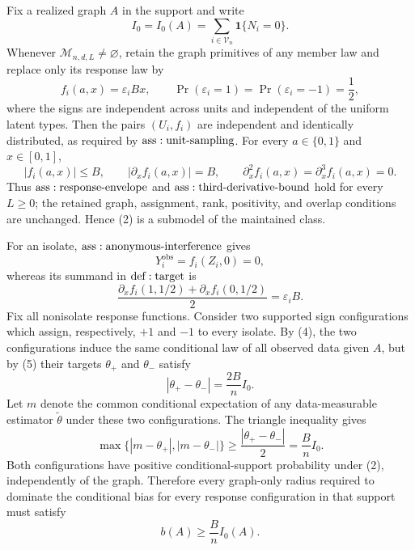 Fix a realized graph \(A\) in the support and write
\[
 I_0=I_0(A)=\sum_{i\in\mathcal V_n}\mathbf1\{N_i=0\}.
\tag{1}
\]
Whenever \(\mathcal M_{n,d,L}\ne\varnothing\), retain the graph primitives of any member law and replace only its response law by
\[
 f_i(a,x)=\varepsilon_iBx,
 \qquad
 \Pr(\varepsilon_i=1)=\Pr(\varepsilon_i=-1)=\frac12,
\tag{2}
\]
where the signs are independent across units and independent of the uniform latent types.  Then the pairs \((U_i,f_i)\) are independent and identically distributed, as required by \({\rm ass:unit\text{-}sampling}\).  For every \(a\in\{0,1\}\) and \(x\in[0,1]\),
\[
 |f_i(a,x)|\leq B,\qquad
 |\partial_x f_i(a,x)|=B,\qquad
 \partial_x^2f_i(a,x)=\partial_x^3f_i(a,x)=0.
\tag{3}
\]
Thus \({\rm ass:response\text{-}envelope}\) and \({\rm ass:third\text{-}derivative\text{-}bound}\) hold for every \(L\geq0\); the retained graph, assignment, rank, positivity, and overlap conditions are unchanged.  Hence (2) is a submodel of the maintained class.

For an isolate, \({\rm ass:anonymous\text{-}interference}\) gives
\[
 Y_i^{\mathrm{obs}}=f_i(Z_i,0)=0,
\tag{4}
\]
whereas its summand in \({\rm def:target}\) is
\[
 \frac{\partial_xf_i(1,1/2)+\partial_xf_i(0,1/2)}2
 =\varepsilon_iB.
\tag{5}
\]
Fix all nonisolate response functions.  Consider two supported sign configurations which assign, respectively, \(+1\) and \(-1\) to every isolate.  By (4), the two configurations induce the same conditional law of all observed data given \(A\), but by (5) their targets \(\theta_+\) and \(\theta_-\) satisfy
\[
 |\theta_+-\theta_-|=\frac{2B}{n}I_0.
\tag{6}
\]
Let \(m\) denote the common conditional expectation of any data-measurable estimator \(\widetilde\theta\) under these two configurations.  The triangle inequality gives
\[
 \max\{|m-\theta_+|,|m-\theta_-|\}
 \geq\frac{|\theta_+-\theta_-|}{2}
 =\frac BnI_0.
\tag{7}
\]
Both configurations have positive conditional-support probability under (2), independently of the graph.  Therefore every graph-only radius required to dominate the conditional bias for every response configuration in that support must satisfy
\[
 b(A)\geq\frac BnI_0(A).
\tag{8}
\]

